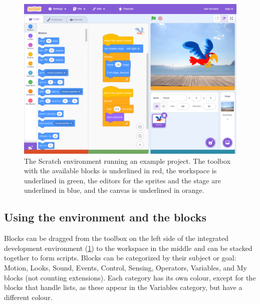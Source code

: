 \documentclass[../main]{subfiles}
\begin{document}
\begin{figure}
    \begin{wide}
        \includegraphics[width=\linewidth]{./scratch-ide}
    \end{wide}
    \caption{The Scratch environment running an example project.
    The toolbox with the available blocks is underlined in \textcolor{ugent-re}{red}, the workspace is underlined in \textcolor{ugent-ps}{green}, the editors for the sprites and the stage are underlined in \textcolor{ugent-we}{blue}, and the canvas is underlined in \textcolor{ugent-lw}{orange}.}
    \label{fig:scratch-environment}
\end{figure}

\subsection{Using the environment and the blocks}\label{subsec:using-the-environment-and-the-blocks}

Blocks can be dragged from the toolbox on the left side of the integrated development environment (\cref{fig:scratch-environment}) to the workspace in the middle and can be stacked together to form scripts.
Blocks can be categorized by their subject or goal: \textcolor{scrmove}{Motion}, \textcolor{scrlook}{Looks}, \textcolor{scrsound}{Sound}, \textcolor{screvent}{Events}, \textcolor{scrcontrol}{Control}, \textcolor{scrsensing}{Sensing}, \textcolor{scroperator}{Operators}, \textcolor{scrvariable}{Variables}, and \textcolor{scrmoreblocks}{My blocks} (not counting extensions).
Each category has its own colour, except for the blocks that handle lists, as these appear in the \textcolor{scrvariable}{Variables} category, but have a different colour.
\end{document}
